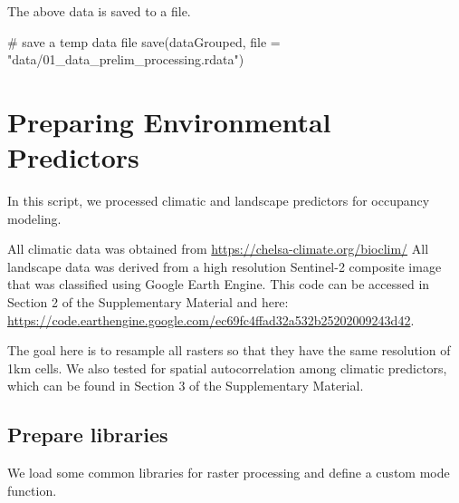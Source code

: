 \documentclass[]{article}
\newenvironment{Shaded}{}{}
\newcommand{\CommentTok}[1]{\textcolor[rgb]{0.00,0.50,0.00}{#1}}
\newcommand{\DataTypeTok}[1]{#1}
\newcommand{\KeywordTok}[1]{\textcolor[rgb]{0.00,0.00,1.00}{#1}}
\newcommand{\NormalTok}[1]{#1}
\newcommand{\StringTok}[1]{\textcolor[rgb]{0.00,0.50,0.50}{#1}}
\begin{document}
The above data is saved to a file.

\begin{Shaded}
\begin{Highlighting}[numbers=left,,]

\CommentTok{# save a temp data file}
\KeywordTok{save}\NormalTok{(dataGrouped, }\DataTypeTok{file =} \StringTok{"data/01_data_prelim_processing.rdata"}\NormalTok{)}
\end{Highlighting}
\end{Shaded}

\hypertarget{preparing-environmental-predictors}{%
\section{Preparing Environmental Predictors}\label{preparing-environmental-predictors}}

In this script, we processed climatic and landscape predictors for occupancy modeling.

All climatic data was obtained from \url{https://chelsa-climate.org/bioclim/}
All landscape data was derived from a high resolution Sentinel-2 composite image that was classified using Google Earth Engine. This code can be accessed in Section 2 of the Supplementary Material and here: \url{https://code.earthengine.google.com/ec69fc4ffad32a532b25202009243d42}.

The goal here is to resample all rasters so that they have the same resolution of 1km cells. We also tested for spatial autocorrelation among climatic predictors, which can be found in Section 3 of the Supplementary Material.

\hypertarget{prepare-libraries}{%
\subsection{Prepare libraries}\label{prepare-libraries}}

We load some common libraries for raster processing and define a custom mode function.
\end{document}
